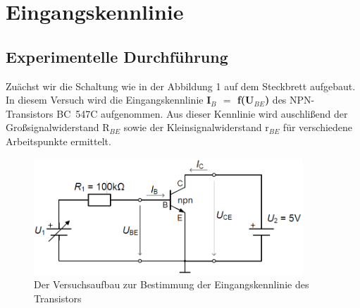 \section{Eingangskennlinie}
\subsection{Experimentelle Durchf\"uhrung}
Zu\"achst wir die Schaltung wie in der Abbildung 1 auf dem Steckbrett aufgebaut. In diesem Versuch wird die Eingangskennlinie \textbf{I$_B$ $=$ f(U$_{BE}$)} des NPN-Transistors BC~547C aufgenommen. Aus dieser Kennlinie wird auschli\ss end der Gro\ss signalwiderstand R$_{BE}$ sowie der Kleinsignalwiderstand r$_{BE}$ f\"ur verschiedene Arbeitspunkte ermittelt. \\
\begin{figure}[!h]
\begin{center}
\includegraphics[width=0.9\textwidth]{eingangsKennlinie}
\caption{Der Versuchsaufbau zur Bestimmung der Eingangskennlinie des Transistors}\label{fig:versuch1}
\end{center}
\end{figure}

